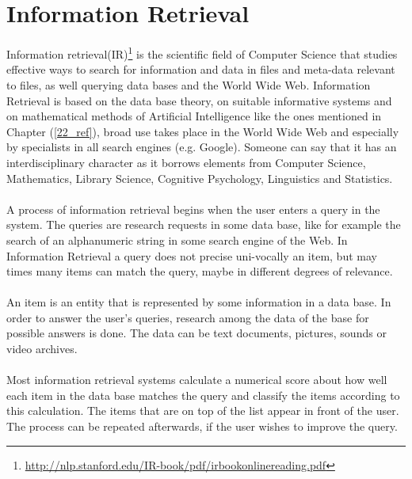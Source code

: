 \section{Information Retrieval}\label{23_ref}
Information retrieval(IR)\footnote{\url{http://nlp.stanford.edu/IR-book/pdf/irbookonlinereading.pdf}} is the scientific field of Computer Science that studies effective ways to search for information and data in files and meta-data relevant to files, as well querying data bases and the World Wide Web. Information Retrieval is based on the data base theory, on suitable informative systems and on mathematical methods of Artificial Intelligence like the ones mentioned in Chapter (\ref{22_ref}), broad use takes place in the World Wide Web and especially by specialists in all search engines (e.g. Google). Someone can say that it has an interdisciplinary character as it borrows elements from Computer Science, Mathematics, Library Science, Cognitive Psychology, Linguistics and Statistics.\\
\\
A process of information retrieval begins when the user enters a query in the system. The queries are research requests in some data base, like for example the search of an alphanumeric string in some search engine of the Web. In Information Retrieval a query does not precise uni-vocally an item, but may times many items can match the query, maybe in different degrees of relevance.\\
\\
An item is an entity that is represented by some information in a data base. In order to answer the user's queries, research among the data of the base for possible answers is done. The data can be text documents, pictures, sounds or video archives.\\
\\
Most information retrieval systems calculate a numerical score about how well each item in the data base matches the query and classify the items according to this calculation. The items that are on top of the list appear in front of the user. The process can be repeated afterwards, if the user wishes to improve the query.

